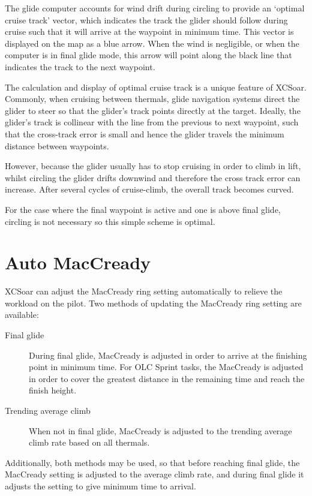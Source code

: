 The glide computer accounts for wind drift during circling to provide
an `optimal cruise track' vector, which indicates the track the glider
should follow during cruise such that it will arrive at the waypoint
in minimum time.  This vector is displayed on the map as a blue arrow.
When the wind is negligible, or when the computer is in final glide
mode, this arrow will point along the black line that indicates the
track to the next waypoint.

The calculation and display of optimal cruise track is a unique
feature of XCSoar.  Commonly, when cruising between thermals, glide
navigation systems direct the glider to steer so that the glider's
track points directly at the target.  Ideally, the glider's track is
collinear with the line from the previous to next waypoint, such that
the cross-track error is small and hence the glider travels the
minimum distance between waypoints.

However, because the glider usually has to stop cruising in order to
climb in lift, whilst circling the glider drifts downwind and
therefore the cross track error can increase.  After several cycles of
cruise-climb, the overall track becomes curved.
%

For the case where the final waypoint is active and one is above final
glide, circling is not necessary so this simple scheme is optimal.


\section{Auto MacCready}\label{sec:auto-maccready}

XCSoar can adjust the MacCready ring setting automatically to relieve the
workload on the pilot.  Two methods of updating the MacCready ring setting
are available:
\begin{description}
\item[Final glide]  During final glide, MacCready is adjusted in order to
 arrive at the finishing point in minimum time.  For OLC Sprint tasks,
 the MacCready is adjusted in order to cover the greatest distance in the remaining
 time and reach the finish height.
\item[Trending average climb] When not in final glide, MacCready is adjusted
to the trending average climb rate based on all thermals.
\end{description}
Additionally, both methods may be used, so that before reaching final glide,
the MacCready setting is adjusted to the average climb rate, and during final
glide it adjusts the setting to give minimum time to arrival.

